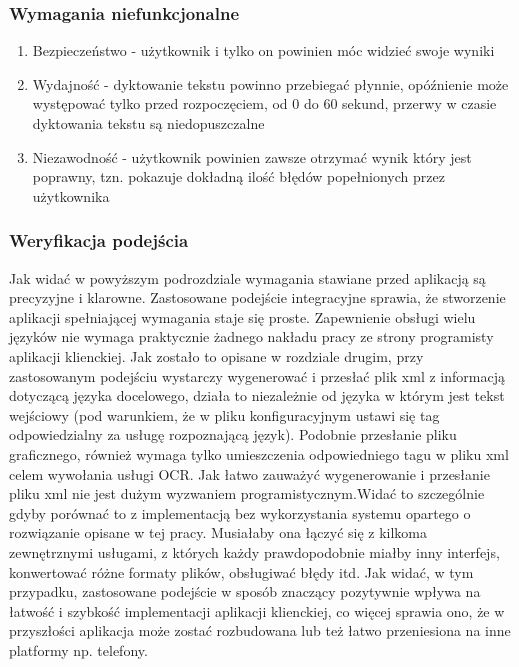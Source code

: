 \subsubsection{Wymagania niefunkcjonalne}
\begin{enumerate}
	\item Bezpieczeństwo - użytkownik i tylko on powinien móc widzieć swoje wyniki
	\item Wydajność - dyktowanie tekstu powinno przebiegać płynnie, opóźnienie może występować tylko przed rozpoczęciem, od 0 do 60 sekund, przerwy w czasie dyktowania tekstu są niedopuszczalne
	\item Niezawodność - użytkownik powinien zawsze otrzymać wynik który jest poprawny, tzn. pokazuje dokładną ilość błędów popełnionych przez użytkownika
\end{enumerate}

\subsubsection{Weryfikacja podejścia}
Jak widać w powyższym podrozdziale wymagania stawiane przed aplikacją są precyzyjne i klarowne. Zastosowane podejście integracyjne sprawia, że stworzenie aplikacji spełniającej wymagania staje się proste. Zapewnienie obsługi wielu języków nie wymaga praktycznie żadnego nakładu pracy ze strony programisty aplikacji klienckiej. Jak zostało to opisane w rozdziale drugim, przy zastosowanym podejściu wystarczy wygenerować i przesłać plik xml z informacją dotyczącą języka docelowego, działa to niezależnie od języka w którym jest tekst wejściowy (pod warunkiem, że w pliku konfiguracyjnym ustawi się tag odpowiedzialny za usługę rozpoznającą język). Podobnie przesłanie pliku graficznego, również wymaga tylko umieszczenia odpowiedniego tagu w pliku xml celem wywołania usługi OCR. Jak łatwo zauważyć wygenerowanie i przesłanie pliku xml nie jest dużym wyzwaniem programistycznym.Widać to szczególnie gdyby porównać to z implementacją bez wykorzystania systemu opartego o rozwiązanie opisane w tej pracy. Musiałaby ona łączyć się z kilkoma zewnętrznymi usługami, z których każdy prawdopodobnie miałby inny interfejs, konwertować różne formaty plików, obsługiwać błędy itd. Jak widać, w tym przypadku, zastosowane podejście w sposób znaczący pozytywnie wpływa na łatwość i szybkość implementacji aplikacji klienckiej, co więcej sprawia ono, że w przyszłości aplikacja może zostać rozbudowana lub też łatwo przeniesiona na inne platformy np. telefony. \\

